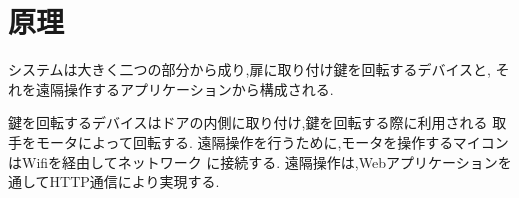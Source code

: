\section{原理}
システムは大きく二つの部分から成り,扉に取り付け鍵を回転するデバイスと,
それを遠隔操作するアプリケーションから構成される.

鍵を回転するデバイスはドアの内側に取り付け,鍵を回転する際に利用される
取手をモータによって回転する.
遠隔操作を行うために,モータを操作するマイコンはWifiを経由してネットワーク
に接続する.
遠隔操作は,Webアプリケーションを通してHTTP通信により実現する.

